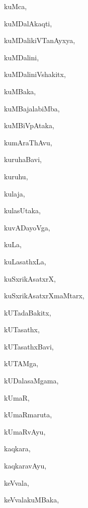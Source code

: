 \begin{multicols}{3}
{\noindent
{kuMca}, \pageref{kuMca}

\noindent
{kuMDalAkaqti}, \pageref{kuMDalAkaqti}

\noindent
{kuMDalikiVTanAyxya}, \pageref{kuMDalikiVTanAyxya}

\noindent
{kuMDalini}, \pageref{kuMDalini}

\noindent
{kuMDaliniVshakitx}, \pageref{kuMDaliniVshakitx}

\noindent
{kuMBaka}, \pageref{kuMBaka}

\noindent
{kuMBajalabiMba}, \pageref{kuMBajalabiMba}

\noindent
{kuMBiVpAtaka}, \pageref{kuMBiVpAtaka}

\noindent
{kumAraThAvu}, \pageref{kumAraThAvu}

\noindent
{kuruhaBavi}, \pageref{kuruhaBavi}

\noindent
{kuruhu}, \pageref{kuruhu}

\noindent
{kulaja}, \pageref{kulaja}

\noindent
{kulasUtaka}, \pageref{kulasUtaka}

\noindent
{kuvADayoVga}, \pageref{kuvADayoVga}

\noindent
{kuLa}, \pageref{kuLa}

\noindent
{kuLasathxLa}, \pageref{kuLasathxLa}

\noindent
{kuSxrikAsatxrX}, \pageref{kuSxrikAsatxrX}

\noindent
{kuSxrikAsatxrXmaMtarx}, \pageref{kuSxrikAsatxrXmaMtarx}

\noindent
{kUTadaBakitx}, \pageref{kUTadaBakitx}

\noindent
{kUTasathx}, \pageref{kUTasathx}

\noindent
{kUTasathxBavi}, \pageref{kUTasathxBavi}

\noindent
{kUTAMga}, \pageref{kUTAMga}

\noindent
{kUDalasaMgama}, \pageref{kUDalasaMgama}

\noindent
{kUmaR}, \pageref{kUmaR}

\noindent
{kUmaRmaruta}, \pageref{kUmaRmaruta}

\noindent
{kUmaRvAyu}, \pageref{kUmaRvAyu}

\noindent
{kaqkara}, \pageref{kaqkara}

\noindent
{kaqkaravAyu}, \pageref{kaqkaravAyu}

\noindent
{keVvala}, \pageref{keVvala}

\noindent
{keVvalakuMBaka}, \pageref{keVvalakuMBaka}

}
\end{multicols}
